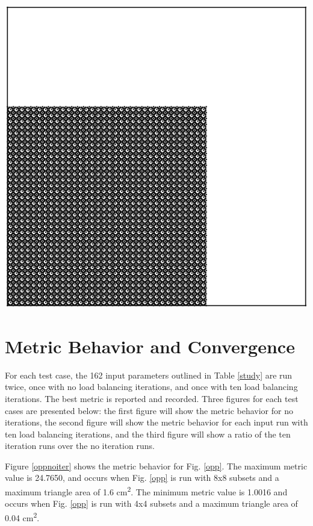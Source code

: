 \noindent\begin{minipage}{\textwidth}
\centering
\includegraphics[scale = 0.5]{figures/lattice-12-shifted.eps}
\label{lattice}
\end{minipage}

\section{Metric Behavior and Convergence}

For each test case, the 162 input parameters outlined in Table \ref{study} are run twice, once with no load balancing iterations, and once with ten load balancing iterations. The best metric is reported and recorded. Three figures for each test cases are presented below: the first figure will show the metric behavior for no iterations, the second figure will show the metric behavior for each input run with ten load balancing iterations, and the third figure will show a ratio of the ten iteration runs over the no iteration runs.

Figure \ref{oppnoiter} shows the metric behavior for Fig. \ref{opp}. The maximum metric value is 24.7650, and occurs when Fig. \ref{opp} is run with 8x8 subsets and a maximum triangle area of 1.6 cm\textsuperscript{2}. The minimum metric value is 1.0016 and occurs when Fig. \ref{opp} is run with 4x4 subsets and a maximum triangle area of 0.04 cm\textsuperscript{2}. 

